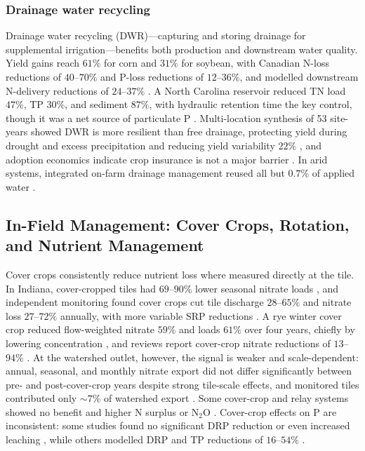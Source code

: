 \documentclass[11pt]{article}
\begin{document}
\subsubsection{Drainage water recycling}

Drainage water recycling (DWR)---capturing and storing drainage for
supplemental irrigation---benefits both production and downstream water
quality. Yield gains reach $61\%$ for corn and $31\%$ for soybean, with
Canadian N-loss reductions of $40$--$70\%$ and P-loss reductions of
$12$--$36\%$, and modelled downstream N-delivery reductions of $24$--$37\%$
\parencite{Hay2021}. A North Carolina reservoir reduced TN load $47\%$, TP
$30\%$, and sediment $87\%$, with hydraulic retention time the key control,
though it was a net source of particulate P \parencite{Moursi2023,Moursi2022}.
Multi-location synthesis of 53 site-years showed DWR is more resilient than
free drainage, protecting yield during drought and excess precipitation and
reducing yield variability $22\%$ \parencite{Willison2021}, and adoption
economics indicate crop insurance is not a major barrier \parencite{Sellars2022}.
In arid systems, integrated on-farm drainage management reused all but
$0.7\%$ of applied water \parencite{Ayars2014,Kosari2024}.

\subsection{In-Field Management: Cover Crops, Rotation, and Nutrient Management}

Cover crops consistently reduce nutrient loss where measured directly at the
tile. In Indiana, cover-cropped tiles had $69$--$90\%$ lower seasonal nitrate
loads \parencite{Hanrahan2018}, and independent monitoring found cover crops
cut tile discharge $28$--$65\%$ and nitrate loss $27$--$72\%$ annually, with
more variable SRP reductions \parencite{Speir2022,Trentman2020}. A rye winter
cover crop reduced flow-weighted nitrate $59\%$ and loads $61\%$ over four
years, chiefly by lowering concentration \parencite{Kaspar2007}, and reviews
report cover-crop nitrate reductions of $13$--$94\%$ \parencite{Ward2018}. At
the watershed outlet, however, the signal is weaker and scale-dependent:
annual, seasonal, and monthly nitrate export did not differ significantly
between pre- and post-cover-crop years despite strong tile-scale effects, and
monitored tiles contributed only $\sim7\%$ of watershed export
\parencite{Hanrahan2018,Speir2022}. Some cover-crop and relay systems showed
no benefit and higher N surplus or N$_2$O
\parencite{Emmett2022,Askar2023}. Cover-crop effects on P are inconsistent:
some studies found no significant DRP reduction or even increased leaching
\parencite{deOliveira2022,Liu2019}, while others modelled DRP and TP reductions
of $16$--$54\%$ \parencite{Grewal2025,Askar2021b}.
\end{document}
